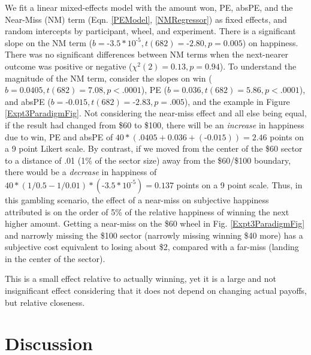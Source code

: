 \documentclass[10pt,letterpaper]{article}
\newcommand{\red}[1]{\textcolor{Red}{#1}}
\begin{document}
We fit a linear mixed-effects model with the amount won, PE, absPE, and the Near-Miss (NM) term (Eqn. \ref{PEModel}, \ref{NMRegressor}) as fixed effects, and random intercepts by participant, wheel, and experiment. There is a significant slope on the NM term ($b = \text{-}3.5 * 10^{\text{-}5}, t(682)=\text{-}2.80, p=0.005$) on happiness. There was no significant differences between NM terms when the next-nearer outcome was positive or negative ($\chi^2(2)=0.13, p=0.94$). To understand the magnitude of the NM term, consider the slopes on win ($b = 0.0405, t(682) = 7.08, p<.0001$), PE ($b=0.036, t(682)=5.86, p<.0001$), and absPE ($b=\text{-}0.015, t(682) = \text{-}2.83, p=.005$), and the example in Figure \ref{Expt3ParadigmFig}. Not considering the near-miss effect and all else being equal, if the result had changed from \$60 to \$100, there will be an \textit{increase} in happiness due to win, PE and absPE of $40*(.0405+0.036+(\text{-}0.015)) = 2.46$ points on a 9 point Likert scale. By contrast, if we moved from the center of the \$60 sector to a distance of .01 (1\% of the sector size) away from the \$60/\$100 boundary, there would be a \textit{decrease} in happiness of $40*(1/0.5 - 1/0.01)*(\text{-}3.5 * 10^{\text{-}5}) = 0.137$ points on a 9 point scale. Thus, in this gambling scenario, the effect of a near-miss on subjective happiness attributed is on the order of 5\% of the relative happiness of winning the next higher amount. Getting a near-miss on the \$60 wheel in Fig. \ref{Expt3ParadigmFig} and narrowly missing the \$100 sector (narrowly missing winning \$40 more) has a subjective cost equivalent to losing about \$2, compared with a far-miss (landing in the center of the sector). 

This is a small effect relative to actually winning, yet it is a large and not insignificant effect considering that it does not depend on changing actual payoffs, but relative closeness. 



\section{Discussion}
\end{document}
